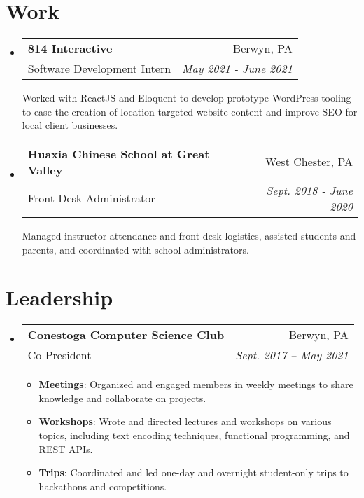 \documentclass[letterpaper,11pt]{article}
\makeatletter
\newcommand{\resumeSubheading}[4]{
  \vspace{-2pt}\item
    \begin{tabular*}{0.97\textwidth}[t]{l@{\extracolsep{\fill}}r}
      \textbf{#1} & #2 \\
      {#3} & \textit{\small #4} \\[3pt]
    \end{tabular*}\vspace{-5pt}
}
\newenvironment{resumeSubHeadingList}{\begin{itemize}[leftmargin=*, label={}]}{\end{itemize}}
\newenvironment{resumeItemList}{\vspace{-2pt}\begin{itemize}}{\end{itemize}\vspace{-5pt}}
\newcommand{\resumeItem}[2]{\item\small{\textbf{#1}{: #2 \vspace{-2pt}}}}
\makeatother
\begin{document}
\section{Work}
  \begin{resumeSubHeadingList}

    \resumeSubheading%
      {814 Interactive}%
      {Berwyn, PA}%
      {Software Development Intern}%
      {May 2021 - June 2021}

      Worked with ReactJS and Eloquent to develop prototype WordPress tooling to ease the creation
        of location-targeted website content and improve SEO for local client businesses.

    \resumeSubheading%
      {Huaxia Chinese School at Great Valley}%
      {West Chester, PA}%
      {Front Desk Administrator}%
      {Sept. 2018 - June 2020}

      Managed instructor attendance and front desk logistics, assisted students and parents, and
        coordinated with school administrators.

  \end{resumeSubHeadingList}

\section{Leadership}
  \begin{resumeSubHeadingList}

    \resumeSubheading%
      {Conestoga Computer Science Club}%
      {Berwyn, PA}%
      {Co-President}%
      {Sept. 2017 -- May 2021}

      \begin{resumeItemList}
        \resumeItem{Meetings}%
          {Organized and engaged members in weekly meetings to share knowledge and collaborate on
            projects.}
        \resumeItem{Workshops}%
          {Wrote and directed lectures and workshops on various topics, including text encoding
            techniques, functional programming, and REST APIs.}
        \resumeItem{Trips}%
          {Coordinated and led one-day and overnight student-only trips to hackathons and
            competitions.}
      \end{resumeItemList}

  \end{resumeSubHeadingList}
\end{document}
